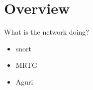 %
%
%
%
%

\section{Overview}
What is the network doing?

\begin{itemize}
 \item snort
 \item MRTG
 \item Aguri
\end{itemize}

